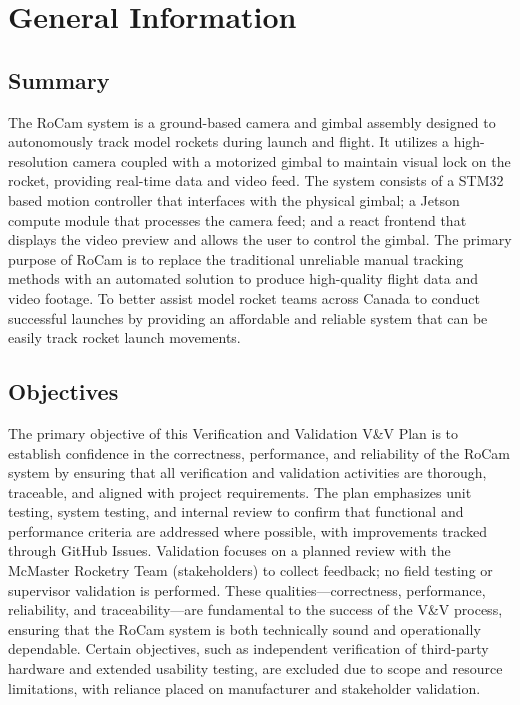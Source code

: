 \documentclass[12pt, titlepage]{article}
\begin{document}
\section{General Information}

\subsection{Summary}

The RoCam system is a ground-based camera and gimbal assembly designed to
autonomously track model rockets during launch and flight. It utilizes a
high-resolution camera coupled with a motorized gimbal to maintain visual lock
on the rocket, providing real-time data and video feed. The system consists of
a STM32 based motion controller that interfaces with the physical gimbal; a
Jetson compute module that processes the camera feed; and a react frontend that
displays the video preview and allows the user to control the gimbal. The
primary purpose of RoCam is to replace the traditional unreliable manual
tracking methods with an automated solution to produce high-quality flight data
and video footage. To better assist model rocket teams across Canada to conduct
successful launches by providing an affordable and reliable system that can be
easily track rocket launch movements.

\subsection{Objectives}
The primary objective of this Verification and Validation V\&V Plan is to
establish confidence in the correctness, performance, and reliability of the
RoCam system by ensuring that all verification and validation activities are
thorough, traceable, and aligned with project requirements. The plan emphasizes
unit testing, system testing, and internal review to confirm that functional
and performance criteria are addressed where possible, with improvements
tracked through GitHub Issues. Validation focuses on a planned review with the
McMaster Rocketry Team (stakeholders) to collect feedback; no field testing or
supervisor validation is performed. These qualities—correctness, performance,
reliability, and traceability—are fundamental to the success of the V\&V
process, ensuring that the RoCam system is both technically sound and
operationally dependable. Certain objectives, such as independent verification
of third-party hardware and extended usability testing, are excluded due to
scope and resource limitations, with reliance placed on manufacturer and
stakeholder validation.
\end{document}

